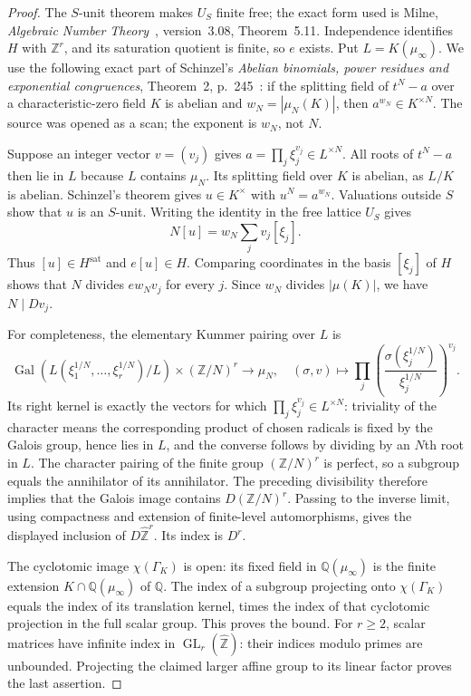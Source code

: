 \begin{proof}
The $S$-unit theorem makes $U_S$ finite free; the exact form used is
Milne, \emph{Algebraic Number Theory}~\cite{MilneANT2020}, version~3.08, Theorem~5.11.
Independence identifies $H$ with $\mathbb Z^r$, and its saturation
quotient is finite, so $e$ exists.
Put $L=K(\mu_\infty)$. We use the following exact part of Schinzel's
\emph{Abelian binomials, power residues and exponential congruences},
Theorem~2, p.~245~\cite{Schinzel1977}: if the splitting field of $t^N-a$ over a
characteristic-zero field $K$ is abelian and
$w_N=|\mu_N(K)|$, then $a^{w_N}\in K^{\times N}$.
The source was opened as a scan; the exponent is $w_N$, not $N$.

Suppose an integer vector $v=(v_j)$ gives
$a=\prod_j\xi_j^{v_j}\in L^{\times N}$.
All roots of $t^N-a$ then lie in $L$ because $L$ contains $\mu_N$.
Its splitting field over $K$ is abelian, as $L/K$ is abelian.
Schinzel's theorem gives $u\in K^\times$ with
$u^N=a^{w_N}$. Valuations outside $S$ show that $u$ is an $S$-unit.
Writing the identity in the free lattice $U_S$ gives
\[
 N[u]=w_N\sum_jv_j[\xi_j].
\]
Thus $[u]\in H^{\mathrm{sat}}$ and $e[u]\in H$. Comparing
coordinates in the basis $[\xi_j]$ of $H$ shows that
$N$ divides $ew_Nv_j$ for every $j$. Since $w_N$ divides $|\mu(K)|$,
we have $N\mid Dv_j$.

For completeness, the elementary Kummer pairing over $L$ is
\[
 \operatorname{Gal}(L(\xi_1^{1/N},\ldots,\xi_r^{1/N})/L)
 \times (\mathbb Z/N)^r\longrightarrow\mu_N,
\quad
 (\sigma,v)\longmapsto
 \prod_j\left(\frac{\sigma(\xi_j^{1/N})}{\xi_j^{1/N}}\right)^{v_j}.
\]
Its right kernel is exactly the vectors for which
$\prod_j\xi_j^{v_j}\in L^{\times N}$: triviality of the character
means the corresponding product of chosen radicals is fixed by the
Galois group, hence lies in $L$, and the converse follows by dividing
by an $N$th root in $L$. The character pairing of the finite group
$(\mathbb Z/N)^r$ is perfect, so a subgroup equals the annihilator of
its annihilator. The preceding divisibility therefore implies that
the Galois image contains $D(\mathbb Z/N)^r$.
Passing to the inverse limit, using compactness and extension of
finite-level automorphisms, gives the displayed inclusion of
$D\widehat{\mathbb Z}^{r}$. Its index is $D^r$.

The cyclotomic image $\chi(\Gamma_K)$ is open: its fixed field in
$\mathbb Q(\mu_\infty)$ is the finite extension
$K\cap\mathbb Q(\mu_\infty)$ of $\mathbb Q$.
The index of a subgroup projecting onto $\chi(\Gamma_K)$ equals
the index of its translation kernel, times the index of that
cyclotomic projection in the full scalar group. This proves the bound.
For $r\geq2$, scalar matrices have infinite index in
$\operatorname{GL}_r(\widehat{\mathbb Z})$: their indices modulo
primes are unbounded. Projecting the claimed larger affine group to
its linear factor proves the last assertion.


\end{proof}
